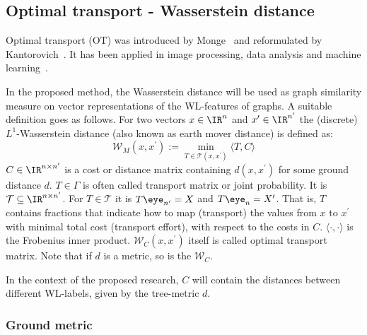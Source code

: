 \subsection{Optimal transport - Wasserstein distance} %

Optimal transport (OT) was introduced by Monge~\cite{1781_Monge_CITATION} and reformulated by Kantorovich~\cite{1942_Kantorovich_CITATION}.
It has been applied in image processing, data analysis and machine learning~\cite{2019_Peyre}.

In the proposed method, the Wasserstein distance will be used as graph similarity measure on vector representations of the WL-features of graphs.
A suitable definition goes as follows.
For two vectors $x \in \IR^{n}$ and $x^\prime\in\IR^{n^\prime}$ the (discrete) $L^1$-Wasserstein distance (also known as earth mover distance) is defined as:
\begin{equation}
	\mathcal{W}_M(x, x^\prime) := \min\limits_{T\in\mathcal{T}(x,x^\prime)} \langle T,C\rangle
\end{equation}
$C\in\IR^{n\times n^\prime}$ is a cost or distance matrix containing $d(x,x^\prime)$ for some ground distance $d$.
$T\in\Gamma$ is often called transport matrix or joint probability.
It is $\mathcal{T}\subseteq \IR^{n\times n^\prime}$.
For $T\in\mathcal{T}$ it is $T\eye_{n^\prime}=X$ and $T\eye_{n}=X^\prime$.
That is, $T$ contains fractions that indicate how to map (transport) the values from $x$ to $x^\prime$ with minimal total cost (transport effort), with respect to the costs in $C$.
$\langle\cdot,\cdot\rangle$ is the Frobenius inner product.
$\mathcal{W}_C(x, x^\prime)$ itself is called optimal transport matrix.
Note that if $d$ is a metric, so is the $\mathcal{W}_C$.%

In the context of the proposed research, $C$ will contain the distances between different WL-labels, given by the tree-metric $d$.


\subsubsection{Ground metric}

